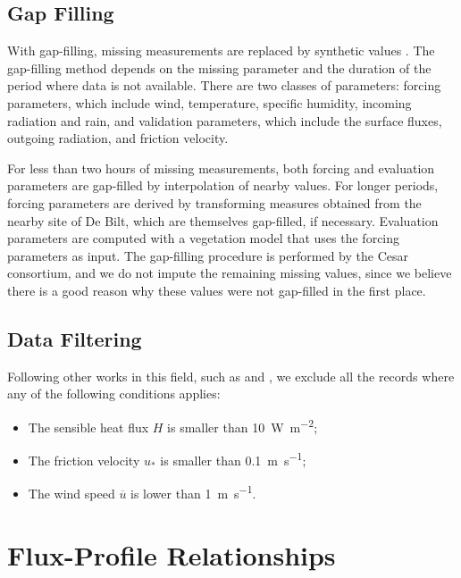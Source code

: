 \documentclass[a4paper]{book}
\begin{document}
\subsection{Gap Filling}
\label{sec:gap_filling}
With gap-filling, missing measurements are replaced by synthetic values \citep{cabauw_gapfilling}. The gap-filling method depends on the missing parameter and the duration of the period where data is not available. There are two classes of parameters: forcing parameters, which include wind, temperature, specific humidity, incoming radiation and rain, and validation parameters, which include the surface fluxes, outgoing radiation, and friction velocity.

For less than two hours of missing measurements, both forcing and evaluation parameters are gap-filled by interpolation of nearby values. For longer periods, forcing parameters are derived by transforming measures obtained from the nearby site of De Bilt, which are themselves gap-filled, if necessary. Evaluation parameters are computed with a vegetation model that uses the forcing parameters as input. The gap-filling procedure is performed by the Cesar consortium, and we do not impute the remaining missing values, since we believe there is a good reason why these values were not gap-filled in the first place.

\subsection{Data Filtering}
\label{sec:data_filter}
Following other works in this field, such as \cite{boulder} and \cite{hogstrom88}, we exclude all the records where any of the following conditions applies:

\begin{itemize}
\item The sensible heat flux $H$ is smaller than \SI{10}{\watt\per\square\meter};
\item The friction velocity $u_*$ is smaller than \SI{0.1}{\meter\per\second};
\item The wind speed $\overline{u}$ is lower than \SI{1}{\meter\per\second}.
\end{itemize}


\section{Flux-Profile Relationships}
\label{sec:profiles}
\end{document}
